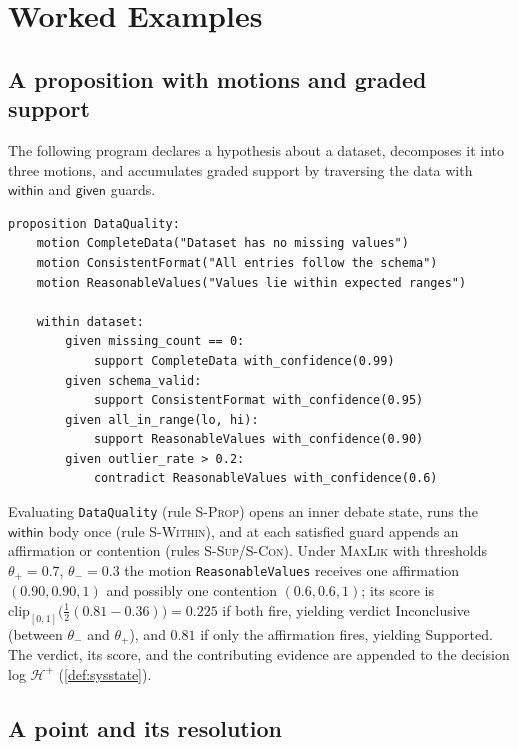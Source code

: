 \documentclass[11pt,a4paper]{article}
\theoremstyle{plain}
\theoremstyle{definition}
\theoremstyle{remark}
\newcommand{\rn}[1]{\textsc{#1}}                          %
\newcommand{\Unit}{[0,1]}
\begin{document}
\section{Worked Examples}
\label{sec:examples}

\subsection{A proposition with motions and graded support}

The following program declares a hypothesis about a dataset, decomposes it into
three motions, and accumulates graded support by traversing the data with
$\mathsf{within}$ and $\mathsf{given}$ guards.

\begin{lstlisting}
proposition DataQuality:
    motion CompleteData("Dataset has no missing values")
    motion ConsistentFormat("All entries follow the schema")
    motion ReasonableValues("Values lie within expected ranges")

    within dataset:
        given missing_count == 0:
            support CompleteData with_confidence(0.99)
        given schema_valid:
            support ConsistentFormat with_confidence(0.95)
        given all_in_range(lo, hi):
            support ReasonableValues with_confidence(0.90)
        given outlier_rate > 0.2:
            contradict ReasonableValues with_confidence(0.6)
\end{lstlisting}

Evaluating \texttt{DataQuality} (rule \rn{S-Prop}) opens an inner debate state,
runs the $\mathsf{within}$ body once (rule \rn{S-Within}), and at each satisfied
guard appends an affirmation or contention (rules \rn{S-Sup}/\rn{S-Con}). Under
\textsc{MaxLik} with thresholds $\theta_+=0.7$, $\theta_-=0.3$ the motion
\texttt{ReasonableValues} receives one affirmation $(0.90,0.90,1)$ and possibly
one contention $(0.6,0.6,1)$; its score is
$\mathrm{clip}_\Unit\!\big(\tfrac{1}{2}(0.81-0.36)\big)=0.225$ if both fire,
yielding verdict \textsf{Inconclusive} (between $\theta_-$ and $\theta_+$), and
$0.81$ if only the affirmation fires, yielding \textsf{Supported}. The verdict,
its score, and the contributing evidence are appended to the decision log
$\mathcal{H}^{+}$ (\cref{def:sysstate}).

\subsection{A point and its resolution}
\end{document}
